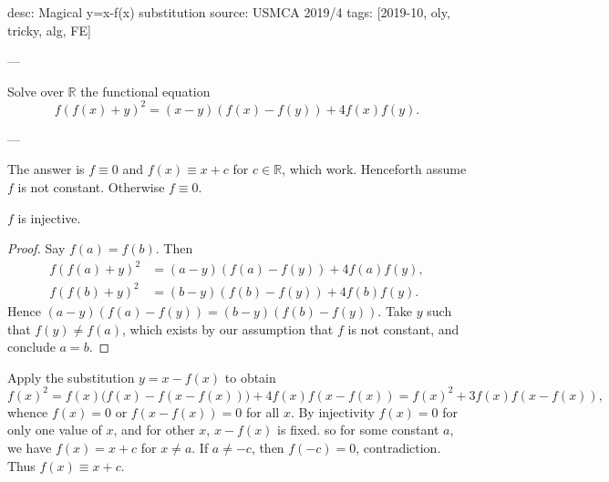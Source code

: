 desc: Magical y=x-f(x) substitution
source: USMCA 2019/4
tags: [2019-10, oly, tricky, alg, FE]

---

Solve over $\mathbb R$ the functional equation \[f(f(x)+y)^2=(x-y)(f(x)-f(y))+4f(x)f(y).\]

---

The answer is $f\equiv0$ and $f(x)\equiv x+c$ for $c\in\mathbb R$, which work. Henceforth assume $f$ is not constant. Otherwise $f\equiv0$.
\begin{claim*}
    $f$ is injective.
\end{claim*}
\begin{proof}
    Say $f(a)=f(b)$. Then 
    \begin{align*}
        f(f(a)+y)^2&=(a-y)(f(a)-f(y))+4f(a)f(y),\\
        f(f(b)+y)^2&=(b-y)(f(b)-f(y))+4f(b)f(y).
    \end{align*}
    Hence $(a-y)(f(a)-f(y))=(b-y)(f(b)-f(y))$. Take $y$ such that $f(y)\ne f(a)$, which exists by our assumption that $f$ is not constant, and conclude $a=b$.
\end{proof}

Apply the substitution $y=x-f(x)$ to obtain \[f(x)^2=f(x)\big(f(x)-f(x-f(x))\big)+4f(x)f(x-f(x))=f(x)^2+3f(x)f(x-f(x)),\]
whence $f(x)=0$ or $f(x-f(x))=0$ for all $x$. By injectivity $f(x)=0$ for only one value of $x$, and for other $x$, $x-f(x)$ is fixed. so for some constant $a$, we have $f(x)=x+c$ for $x\ne a$. If $a\ne -c$, then $f(-c)=0$, contradiction. Thus $f(x)\equiv x+c$.
